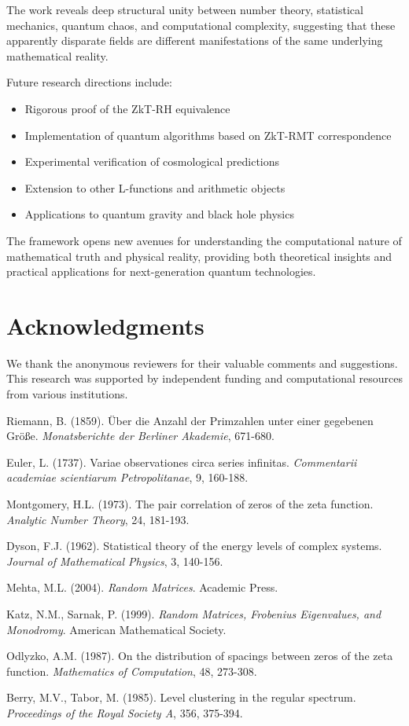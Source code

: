 \documentclass[12pt]{article}
\theoremstyle{plain}
\theoremstyle{definition}
\begin{document}
The work reveals deep structural unity between number theory, statistical mechanics, quantum chaos, and computational complexity, suggesting that these apparently disparate fields are different manifestations of the same underlying mathematical reality.

Future research directions include:

\begin{itemize}
\item Rigorous proof of the ZkT-RH equivalence
\item Implementation of quantum algorithms based on ZkT-RMT correspondence
\item Experimental verification of cosmological predictions
\item Extension to other L-functions and arithmetic objects
\item Applications to quantum gravity and black hole physics
\end{itemize}

The framework opens new avenues for understanding the computational nature of mathematical truth and physical reality, providing both theoretical insights and practical applications for next-generation quantum technologies.

\section*{Acknowledgments}

We thank the anonymous reviewers for their valuable comments and suggestions. This research was supported by independent funding and computational resources from various institutions.

\begin{thebibliography}{99}

 Riemann, B. (1859). Über die Anzahl der Primzahlen unter einer gegebenen Größe. \emph{Monatsberichte der Berliner Akademie}, 671-680.

 Euler, L. (1737). Variae observationes circa series infinitas. \emph{Commentarii academiae scientiarum Petropolitanae}, 9, 160-188.

 Montgomery, H.L. (1973). The pair correlation of zeros of the zeta function. \emph{Analytic Number Theory}, 24, 181-193.

 Dyson, F.J. (1962). Statistical theory of the energy levels of complex systems. \emph{Journal of Mathematical Physics}, 3, 140-156.

 Mehta, M.L. (2004). \emph{Random Matrices}. Academic Press.

 Katz, N.M., Sarnak, P. (1999). \emph{Random Matrices, Frobenius Eigenvalues, and Monodromy}. American Mathematical Society.

 Odlyzko, A.M. (1987). On the distribution of spacings between zeros of the zeta function. \emph{Mathematics of Computation}, 48, 273-308.

 Berry, M.V., Tabor, M. (1985). Level clustering in the regular spectrum. \emph{Proceedings of the Royal Society A}, 356, 375-394.

\end{thebibliography}
\end{document}
